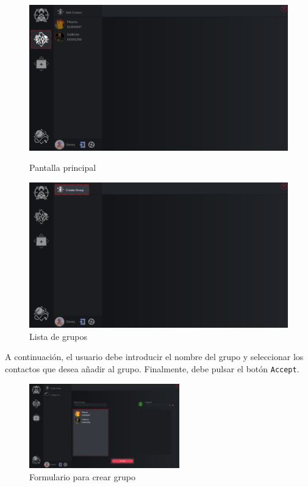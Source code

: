 \begin{figure}[H]
    \centering
    \begin{minipage}[b]{0.48\textwidth}
        \centering
        \includegraphics[width=\textwidth]{images/manualDeUsuario/HacerGrupo1.png}
        \caption*{Pantalla principal}
    \end{minipage}
    \hfill
    \begin{minipage}[b]{0.48\textwidth}
        \centering
        \includegraphics[width=\textwidth]{images/manualDeUsuario/HacerGrupo2.png}
        \caption*{Lista de grupos}
    \end{minipage}
\end{figure}

A continuación, el usuario debe introducir el nombre del grupo y seleccionar los contactos que desea añadir al grupo. Finalmente, debe pulsar el botón \texttt{Accept}.

\begin{figure}[H]
    \centering
    \includegraphics[width=0.58\textwidth]{images/manualDeUsuario/HacerGrupo3.png}
    \caption*{Formulario para crear grupo}
\end{figure}

